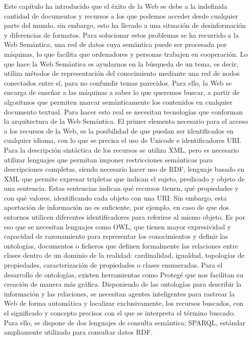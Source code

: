 Este capítulo ha introducido que el éxito de la Web se debe a la indefinida cantidad de documentos y recursos a los que podemos acceder desde cualquier parte del mundo, sin embargo, esto ha llevado a una situación de desinformación y diferencias de formatos. Para solucionar estos problemas se ha recurrido a la Web Semántica, una red de datos cuya semántica puede ser procesada por máquinas, lo que facilita que ordenadores y personas trabajen en cooperación. Lo que hace la Web Semántica es ayudarnos en la búsqueda de un tema, es decir, utiliza métodos de representación del conocimiento mediante una red de nodos conectados entre sí, para no confundir temas parecidos. Para ello, la Web se encarga de enseñar a las máquinas a saber lo que queremos buscar, a partir de algoritmos que permiten marcar semánticamente los contenidos en cualquier documento textual. Para hacer esto real se necesitan tecnologías que conforman la arquitectura de la Web Semántica. El primer elemento necesario para el acceso a los recursos de la Web, es la posibilidad de que puedan ser identificados en cualquier idioma, con lo que se precisa el uso de Unicode e identificadores URI. Para la descripción sintáctica de los recursos se utiliza XML, pero es necesario utilizar lenguajes que permitan imponer restricciones semánticas para descripciones completas, siendo necesario hacer uso de RDF, lenguaje basado en XML que permite expresar tripletas que indican el sujeto, predicado y objeto de una sentencia. Estas sentencias indican qué recursos tienen, qué propiedades y con qué valores, identificando cada objeto con una URI. Sin embargo, esta aportación de información no es suficiente, por ejemplo, en caso de que dos entornos utilicen diferentes identificadores para referirse al mismo objeto. Es por eso que se necesitan lenguajes como OWL, que tienen mayor expresividad y capacidad de razonamiento para representar los conocimientos y definir las ontologías, documentos o ficheros que definen formalmente las relaciones entre clases dentro de un dominio de la realidad: cardinalidad, igualdad, topologías de propiedades, caracterización de propiedades o clases enumeradas. Para el desarrollo de ontologías, existen herramientas como Protegé que nos facilitan su creación de manera más gráfica. Disponiendo de las ontologías para describir la información y las relaciones, se necesitan agentes inteligentes para rastrear la Web de forma automática y localizar exclusivamente, los recursos buscados, con el significado y concepto precisos con el que se interpreta el término buscado. Para ello, se dispone de dos lenguajes de consulta semántica: SPARQL, estándar ampliamente utilizado para consultar datos RDF.%

